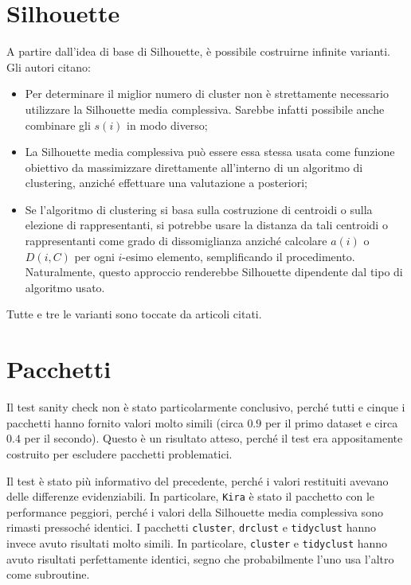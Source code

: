 \documentclass[a4paper, 12pt]{report}
\begin{document}
		\section{Silhouette}

			A partire dall'idea di base di Silhouette, è possibile costruirne
			infinite varianti. Gli autori citano:

			\begin{itemize}
				\item
				Per determinare il miglior numero di cluster non è strettamente
				necessario utilizzare la Silhouette media complessiva. Sarebbe
				infatti possibile anche combinare gli $s(i)$ in modo diverso;
				\item
				La Silhouette media complessiva può essere essa stessa usata
				come funzione obiettivo da massimizzare direttamente all'interno
				di un algoritmo di clustering, anziché effettuare una valutazione
				a posteriori;
				\item
				Se l'algoritmo di clustering si basa sulla costruzione di centroidi
				o sulla elezione di rappresentanti, si potrebbe usare la distanza
				da tali centroidi o rappresentanti come grado di dissomiglianza
				anziché calcolare $a(i)$ o $D(i, C)$ per ogni $i$-esimo elemento,
				semplificando il procedimento. Naturalmente, questo approccio
				renderebbe Silhouette dipendente dal tipo di algoritmo usato. 
			\end{itemize}

			Tutte e tre le varianti sono toccate da articoli citati.

		\section{Pacchetti}

			Il test sanity check non è stato particolarmente conclusivo,
			perché tutti e cinque i pacchetti hanno fornito valori molto
			simili (circa $0.9$ per il primo dataset e circa $0.4$ per il
			secondo). Questo è un risultato atteso, perché il test era
			appositamente costruito per escludere pacchetti problematici.

			Il test è stato più informativo del precedente,
			perché i valori restituiti avevano delle differenze
			evidenziabili. In particolare, \texttt{Kira} è stato il
			pacchetto con le performance peggiori, perché i valori
			della Silhouette media complessiva sono rimasti pressoché
			identici. I pacchetti \texttt{cluster}, \texttt{drclust}
			e \texttt{tidyclust} hanno invece avuto risultati molto
			simili. In particolare, \texttt{cluster} e \texttt{tidyclust}
			hanno avuto risultati perfettamente identici, segno che
			probabilmente l'uno usa l'altro come subroutine.
\end{document}
